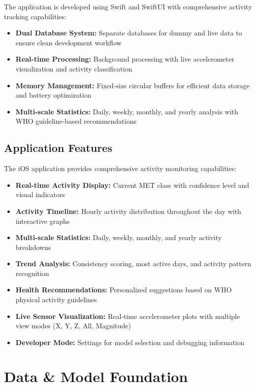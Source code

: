 \documentclass[11pt,a4paper]{article}
\begin{document}
The application is developed using Swift and SwiftUI with comprehensive activity tracking capabilities:

\begin{itemize}
    \item \textbf{Dual Database System:} Separate databases for dummy and live data to ensure clean development workflow
    \item \textbf{Real-time Processing:} Background processing with live accelerometer visualization and activity classification
    \item \textbf{Memory Management:} Fixed-size circular buffers for efficient data storage and battery optimization
    \item \textbf{Multi-scale Statistics:} Daily, weekly, monthly, and yearly analysis with WHO guideline-based recommendations
\end{itemize}

\subsection{Application Features}

The iOS application provides comprehensive activity monitoring capabilities:

\begin{itemize}
    \item \textbf{Real-time Activity Display:} Current MET class with confidence level and visual indicators
    \item \textbf{Activity Timeline:} Hourly activity distribution throughout the day with interactive graphs
    \item \textbf{Multi-scale Statistics:} Daily, weekly, monthly, and yearly activity breakdowns
    \item \textbf{Trend Analysis:} Consistency scoring, most active days, and activity pattern recognition
    \item \textbf{Health Recommendations:} Personalized suggestions based on WHO physical activity guidelines
    \item \textbf{Live Sensor Visualization:} Real-time accelerometer plots with multiple view modes (X, Y, Z, All, Magnitude)
    \item \textbf{Developer Mode:} Settings for model selection and debugging information
\end{itemize}

\section{Data \& Model Foundation}
\end{document}
